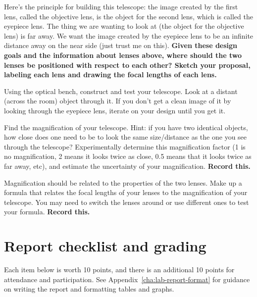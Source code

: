 \begin{steps}
	\item Here's the principle for building this telescope: the image created by the first lens, called the objective lens, is the object for the second lens, which is called the eyepiece lens. The thing we are wanting to look at (the object for the objective lens) is far away. We want the image created by the eyepiece lens to be an infinite distance away on the near side (just trust me on this). \textbf{Given these design goals and the information about lenses above, where should the two lenses be positioned with respect to each other? Sketch your proposal, labeling each lens and drawing the focal lengths of each lens.}
	
	\item Using the optical bench, construct and test your telescope. Look at a distant (across the room) object through it. If you don't get a clean image of it by looking through the eyepiece lens, iterate on your design until you get it.
	
	\item Find the magnification of your telescope. Hint: if you have two identical objects, how close does one need to be to look the same size/distance as the one you see through the telescope? Experimentally determine this magnification factor (1 is no magnification, 2 means it looks twice as close, 0.5 means that it looks twice as far away, etc), and estimate the uncertainty of your magnification. \textbf{Record this.}
	
	\item Magnification should be related to the properties of the two lenses. Make up a formula that relates the focal lengths of your lenses to the magnification of your telescope. You may need to switch the lenses around or use different ones to test your formula. \textbf{Record this.}
\end{steps}

\section{Report checklist and grading}

Each item below is worth 10 points, and there is an additional 10 points for attendance and participation. See Appendix\ \ref{cha:lab-report-format} for guidance on writing the report and formatting tables and graphs.

